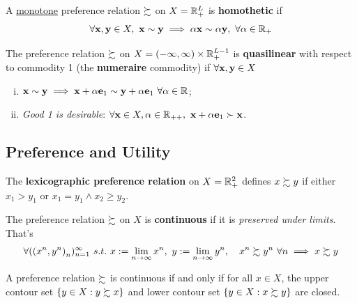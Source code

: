 \documentclass{report}
\begin{document}
 			\begin{definition}[3.B.6]
 				A \ul{monotone} preference relation $\succsim$ on $X = \mathbb{R}^L_+$ is \textbf{homothetic} if 
 				\begin{equation}
 					\forall \textbf{x}, \textbf{y} \in X,\ \textbf{x} \sim \textbf{y} \implies \alpha \textbf{x} \sim \alpha \textbf{y},\ \forall \alpha \in \mathbb{R}_+
 				\end{equation}
 			\end{definition}
 			
 			\begin{definition}[3.B.7]
 				The preference relation $\succsim$ on $X = (-\infty, \infty) \times \mathbb{R}^{L-1}_+$ is \textbf{quasilinear} with respect to commodity 1 (the \textbf{numeraire} commodity) if $\forall \textbf{x}, \textbf{y} \in X$
 				\begin{enumerate}[(i)]
 					\item $\textbf{x} \sim \textbf{y} \implies \textbf{x} + \alpha \textbf{e}_1 \sim \textbf{y} + \alpha \textbf{e}_1\ \forall \alpha \in \mathbb{R}$;
 					\item \emph{Good 1 is desirable}: $\forall \textbf{x} \in X, \alpha \in \mathbb{R}_{++},\ \textbf{x} + \alpha \textbf{e}_1 \succ \textbf{x}$.
 				\end{enumerate}
 			\end{definition}
 
 		\subsection{Preference and Utility}
 			\begin{definition}[Example 3.C.1]
 				The \textbf{lexicographic preference relation} on $X = \mathbb{R}^2_+$ defines $x \succsim y$ if either $x_1 > y_1$ or $x_1 = y_1 \land x_2 \geq y_2$.
 			\end{definition}
 			
 			\begin{definition}[3.C.1]
 				The preference relation $\succsim$ on $X$ is \textbf{continuous} if it is \emph{preserved under limits}. That's 
 				\begin{align}
 					\forall ({(x^n, y^n)}_{n})_{{n}=1}^\infty\ s.t.\ x := \lim_{n\to \infty} x^n,\ y := \lim_{n\to\infty} y^n,\quad
 					x^n \succsim y^n\ \forall n \implies x \succsim y
 				\end{align}
 			\end{definition}
 			
 			\begin{proposition}
 				A preference relation $\succsim$ is continuous if and only if for all $x \in X$, the upper contour set $\{y \in X : y \succsim x\}$ and lower contour set $\{y \in X : x \succsim y\}$ are closed.
 			\end{proposition}
 			
\end{document}
